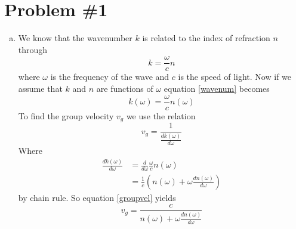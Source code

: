 \documentclass[11pt]{article}
\numberwithin{equation}{section}
\begin{document}


\section{Problem \#1}
\begin{enumerate}[(a)]
\item
We know that the wavenumber $k$ is related to the index of refraction $n$ through
\begin{equation}
k = \frac{\omega}{c}n
\label{wavenum}
\end{equation}
where $\omega$ is the frequency of the wave and $c$ is the speed of light. Now if we assume that $k$ and $n$ are functions of $\omega$ equation \ref{wavenum} becomes
$$k(\omega) = \frac{\omega}{c}n(\omega)$$
To find the group velocity $v_g$ we use the relation
\begin{equation}
v_g = \frac{1}{\frac{dk(\omega)}{d\omega}}
\label{groupvel}
\end{equation}
Where
\begin{align*}
\frac{dk(\omega)}{d\omega} &= \frac{d}{d\omega}\frac{\omega}{c}n(\omega)\\
&= \frac{1}{c}\left(n(\omega)+\omega\frac{dn(\omega)}{d\omega}\right)
\end{align*}
by chain rule. So equation \ref{groupvel} yields
$$v_g = \frac{c}{n(\omega)+\omega\frac{dn(\omega)}{d\omega}}$$


\end{enumerate}
\end{document}
